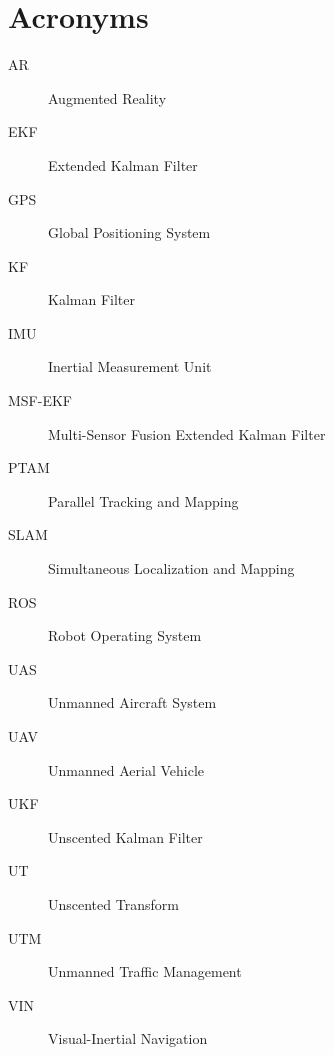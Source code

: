 \chapter*{Acronyms}

\begin{description}
\item [AR] Augmented Reality
\item [EKF] Extended Kalman Filter
\item [GPS] Global Positioning System
\item [KF] Kalman Filter
\item [IMU] Inertial Measurement Unit
\item [MSF-EKF] Multi-Sensor Fusion Extended Kalman Filter
\item [PTAM] Parallel Tracking and Mapping
\item [SLAM] Simultaneous Localization and Mapping
\item [ROS] Robot Operating System
\item [UAS] Unmanned Aircraft System
\item [UAV] Unmanned Aerial Vehicle
\item [UKF] Unscented Kalman Filter
\item [UT] Unscented Transform
\item [UTM] Unmanned Traffic Management
\item [VIN] Visual-Inertial Navigation
\end{description}